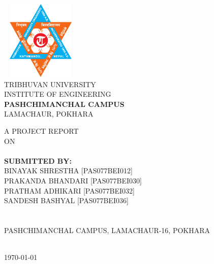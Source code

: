 \begin{titlingpage} 
    \begin{normalsize}
    \begin{center}
    \includegraphics[width=1.5in, height=1.5in]{./Graphics/logo.png}\\
    
     TRIBHUVAN UNIVERSITY\\
     INSTITUTE OF ENGINEERING\\
    
    \textbf{\MakeUppercase PASHCHIMANCHAL CAMPUS}\\
    \MakeUppercase{Lamachaur, Pokhara}
    \end{center}
    \vspace{1cm}
    
    \begin{center}
    A PROJECT REPORT\\
    ON\\
    \textbf{\MakeUppercase \thetitle} \\
    \vspace{1.5 cm}
    \textbf{SUBMITTED BY:}\\
    {\MakeUppercase {Binayak Shrestha [PAS077BEI012]}}\\
    {\MakeUppercase {Prakanda Bhandari [PAS077BEI030]}}\\
    {\MakeUppercase {Pratham Adhikari [PAS077BEI032]}}\\
    {\MakeUppercase {Sandesh Bashyal [PAS077BEI036]}}\\
    \vspace{2 cm}
    \\
    \\
    \MakeUppercase {Pashchimanchal Campus, Lamachaur-16, Pokhara}\par\\
    \vspace{1.5cm}
    {\monthyeardate\today}
    \end{center}
    \end{normalsize}
    \end{titlingpage}
    \newpage